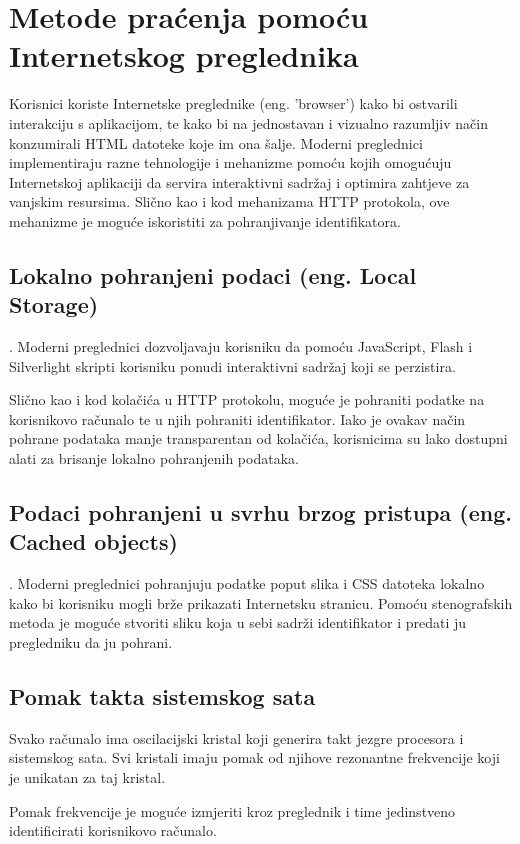 \documentclass[times, utf8, zavrsni]{fer}
\begin{document}
\section{Metode praćenja pomoću Internetskog preglednika}
Korisnici koriste Internetske preglednike (eng. 'browser') kako bi ostvarili
interakciju s aplikacijom, te kako bi na jednostavan i vizualno razumljiv način
konzumirali HTML datoteke koje im ona šalje. Moderni preglednici implementiraju
razne tehnologije i mehanizme pomoću kojih omogućuju Internetskoj aplikaciji da
servira interaktivni sadržaj i optimira zahtjeve za vanjskim resursima. Slično
kao i kod mehanizama HTTP protokola, ove mehanizme je moguće iskoristiti za
pohranjivanje identifikatora. \cite{w3cwg2013html}

\subsection{Lokalno pohranjeni podaci (eng. Local Storage)}. Moderni
preglednici dozvoljavaju korisniku da pomoću JavaScript, Flash i Silverlight
skripti korisniku ponudi interaktivni sadržaj koji se perzistira.

Slično kao i kod kolačića u HTTP protokolu, moguće je pohraniti podatke
na korisnikovo računalo te u njih pohraniti identifikator. Iako je ovakav
način pohrane podataka manje transparentan od kolačića, korisnicima su lako
dostupni alati za brisanje lokalno pohranjenih podataka.

\subsection{Podaci pohranjeni u svrhu brzog pristupa (eng. Cached objects)}.
Moderni preglednici pohranjuju podatke poput slika i CSS datoteka lokalno
kako bi korisniku mogli brže prikazati Internetsku stranicu. Pomoću
stenografskih metoda je moguće stvoriti sliku koja u sebi sadrži
identifikator i predati ju pregledniku da ju pohrani.

\subsection{Pomak takta sistemskog sata}
Svako računalo ima oscilacijski kristal koji generira takt jezgre procesora
i sistemskog sata. Svi kristali imaju pomak od njihove rezonantne
frekvencije koji je unikatan za taj kristal.

Pomak frekvencije je moguće izmjeriti kroz preglednik i time jedinstveno
identificirati korisnikovo računalo.
\end{document}
